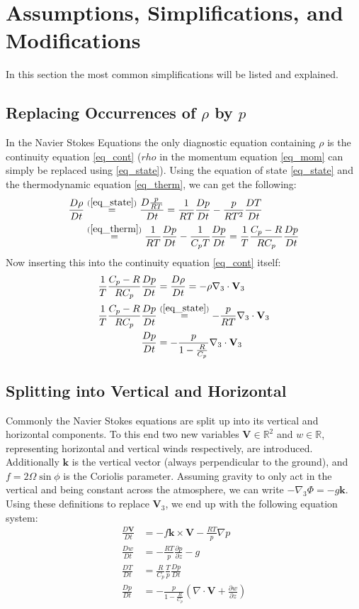 \section{Assumptions, Simplifications, and Modifications}
In this section the most common simplifications will be listed and explained.

\subsection{Replacing Occurrences of $\rho$ by $p$}\label{subsec_rho_p}
In the Navier Stokes Equations the only diagnostic equation containing $\rho$ is the continuity equation \ref{eq_cont} ($rho$ in the momentum equation \ref{eq_mom} can simply be replaced using \ref{eq_state}).
Using the equation of state \ref{eq_state} and the thermodynamic equation \ref{eq_therm}, we can get the following:
\begin{align*}
\frac{D\rho}{Dt} &\stackrel{(\ref{eq_state})}{=} \frac{D\frac{p}{RT}}{Dt} = \frac{1}{RT}\frac{Dp}{Dt}-\frac{p}{RT^2}\frac{DT}{Dt}\\
&\stackrel{(\ref{eq_therm})}{=} \frac{1}{RT}\frac{Dp}{Dt}-\frac{1}{C_pT}\frac{Dp}{Dt} = \frac{1}{T}\frac{C_p-R}{RC_p}\frac{Dp}{Dt}
\end{align*}
Now inserting this into the continuity equation \ref{eq_cont} itself:
\begin{align*}
\frac{1}{T}\frac{C_p-R}{RC_p}\frac{Dp}{Dt} &= \frac{D\rho}{Dt} = -\rho \nabla _3 \cdot \textbf{V}_3\\
\frac{1}{T}\frac{C_p-R}{RC_p}\frac{Dp}{Dt} &\stackrel{(\ref{eq_state})}{=} -\frac{p}{RT} \nabla _3 \cdot \textbf{V}_3\\
\frac{Dp}{Dt} &= - \frac{p}{1-\frac{R}{C_p}} \nabla _3 \cdot \textbf{V}_3
\end{align*}

\subsection{Splitting into Vertical and Horizontal}
Commonly the Navier Stokes equations are split up into its vertical and horizontal components.
To this end two new variables $\textbf{V} \in \mathbb{R}^2$ and $w\in \mathbb{R}$, representing horizontal and vertical winds respectively, are introduced.
Additionally $\boldsymbol{k}$ is the vertical vector (always perpendicular to the ground), and $f=2\Omega \sin \phi$ is the Coriolis parameter.
Assuming gravity to only act in the vertical and being constant across the atmosphere, we can write $-\nabla_3 \Phi = -g \boldsymbol{k}$.
Using these definitions to replace $\textbf{V}_3$, we end up with the following equation system:
\begin{align*}
\frac{D\textbf{V}}{Dt} &= -f\boldsymbol{k} \times \textbf{V} - \frac{RT}{p}\nabla p\\
\frac{Dw}{Dt} &= - \frac{RT}{p} \frac{\partial p}{\partial z} - g \\
\frac{DT}{Dt} &= \frac{R}{C_p}\frac{T}{p}\frac{Dp}{Dt}\\
\frac{Dp}{Dt} &= -\frac{p}{1- \frac{R}{C_p}} (\nabla \cdot \textbf{V} + \frac{\partial w}{\partial z})
\end{align*}


